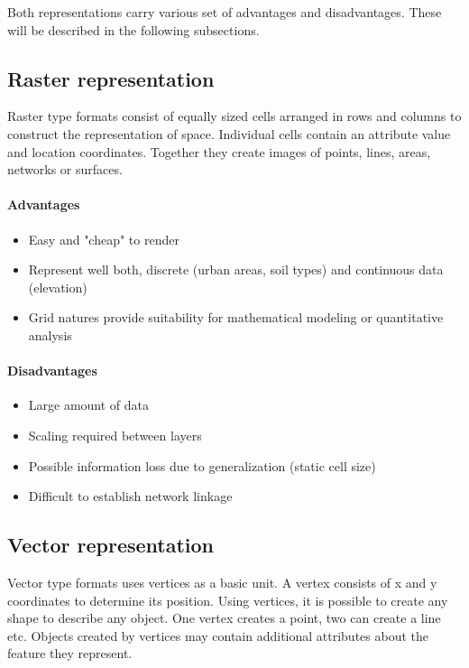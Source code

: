 \documentclass[thesis=M,english]{FITthesis}[2012/10/20]
\begin{document}
Both representations carry various set of advantages and disadvantages. These will be described in the following subsections.

\subsection{Raster representation}
Raster type formats consist of equally sized cells arranged in rows and columns to construct the representation of space. Individual cells contain an attribute value and location coordinates. Together they create images of points, lines, areas, networks or surfaces.

\paragraph*{Advantages}
\begin{itemize}[noitemsep]
\item Easy and "cheap" to render
\item Represent well both, discrete (urban areas, soil types) and continuous data (elevation)
\item Grid natures provide suitability for mathematical modeling or quantitative analysis
\end{itemize}

\paragraph*{Disadvantages}
\begin{itemize}[noitemsep]
\item Large amount of data
\item Scaling required between layers
\item Possible information loss due to generalization (static cell size)
\item Difficult to establish network linkage
\end{itemize}

\subsection{Vector representation}
Vector type formats uses vertices as a basic unit. A vertex consists of x and y coordinates to determine its position. Using vertices, it is possible to create any shape to describe any object. One vertex creates a point, two can create a line etc. Objects created by vertices may contain additional attributes about the feature they represent.
\end{document}
